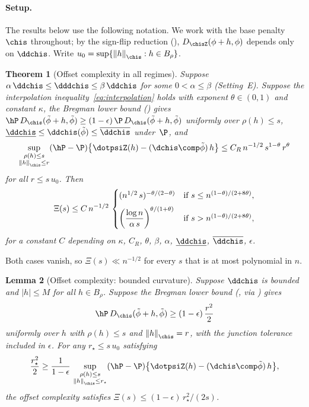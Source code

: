 \documentclass{article}
\newtheorem{theorem}{Theorem}[section]
\newtheorem{lemma}[theorem]{Lemma}
\begin{document}
\paragraph{Setup.}
\label{par:offset-setup}
The results below
use the following notation.
We work with the base penalty $\chis$ throughout;
by the sign-flip reduction (),
$D_{\chisZ}(\phi+h,\phi)$ depends only on $\ddchis$.
Write $u_0 = \sup\{\norm{h}_{\chis} : h \in B_\rho\}$.

\begin{theorem}[Offset complexity in all regimes]
\label{thm:xi-all-regimes}
Suppose $\alpha\, \ddchis \le \dddchis \le \beta\, \ddchis$
for some $0 < \alpha \le \beta$
(Setting~E).
Suppose the interpolation inequality~\eqref{eq:interpolation}
holds with exponent $\theta \in (0,1)$
and constant $\kappa$,
the Bregman lower bound
()
gives
$\hP\, D_{\chis}(\tilde\phi + h, \tilde\phi)
  \ge (1-\epsilon)\, \P\, D_{\chis}(\tilde\phi + h, \tilde\phi)$
uniformly over $\rho(h) \le s$,
$\underline{\ddchis} \le \ddchis(\tilde\phi) \le \overline{\ddchis}$
under~$\P$,
and
\[
\sup_{\substack{\rho(h) \le s \\
    \norm{h}_{\chis} \le r}}
  (\hP - \P)\qty{\dotpsiZ(h) - (\dchis \comp \tilde\phi)\,h}
  \le C_R\, n^{-1/2}\, s^{1-\theta}\, r^\theta
\]
for all $r \le s\, u_0$.
Then
\begin{equation}
\label{eq:xi-all-regimes}
\Xi(s) \le C\, n^{-1/2}\,
\begin{cases}
  (n^{1/2}\, s)^{-\theta/(2-\theta)}
    & \text{if } s \le n^{(1-\theta)/(2+8\theta)}, \\[6pt]
  \qty(\dfrac{\log n}{\alpha\, s})^{\theta/(1+\theta)}
    & \text{if } s > n^{(1-\theta)/(2+8\theta)},
\end{cases}
\end{equation}
for a constant $C$ depending on
$\kappa$, $C_R$, $\theta$,
$\beta$, $\alpha$,
$\underline{\ddchis}$, $\overline{\ddchis}$,
$\epsilon$.
\end{theorem}
Both cases vanish,
so $\Xi(s) \ll n^{-1/2}$
for every $s$ that is at most polynomial in $n$.

\begin{lemma}[Offset complexity: bounded curvature]
\label{lem:xi-bounded}
Suppose $\ddchis$ is bounded
and $|h| \le M$ for all $h \in B_\rho$.
Suppose the Bregman lower bound
(,
via )
gives
\begin{equation}
\label{eq:bregman-shell-bounded}
\hP\, D_{\chis}(\tilde\phi + h, \tilde\phi)
  \ge (1-\epsilon)\, \frac{r^2}{2}
\end{equation}
uniformly over $h$
with $\rho(h) \le s$ and $\norm{h}_{\chis} = r$,
with the junction tolerance included
in $\epsilon$.
For any $r_\star \le s\, u_0$ satisfying
\begin{equation}
\label{eq:critical-bounded}
\frac{r_\star^2}{2}
  \ge \frac{1}{1-\epsilon}\,
  \sup_{\substack{\rho(h) \le s \\
      \norm{h}_{\chis} \le r_\star}}
    (\hP - \P)\qty{\dotpsiZ(h) - (\dchis \comp \tilde\phi)\,h},
\end{equation}
the offset complexity satisfies
$\Xi(s) \le (1-\epsilon)\, r_\star^2/(2s)$.
\end{lemma}
\end{document}
